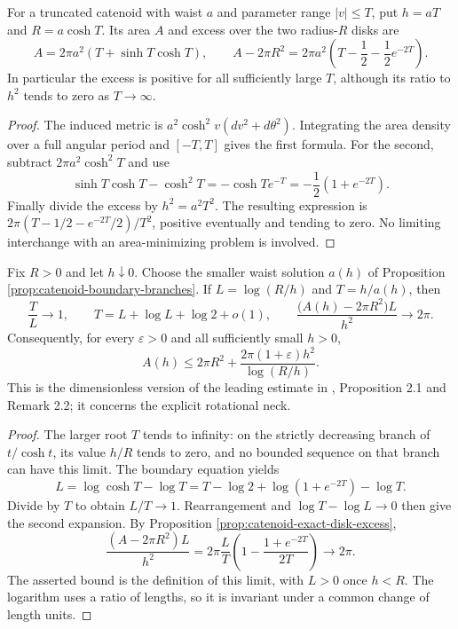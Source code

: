 \begin{proposition}\label{prop:catenoid-exact-disk-excess}
For a truncated catenoid with waist $a$ and parameter range $|v|\leq T$, put $h=aT$ and $R=a\cosh T$. Its area $A$ and excess over the two radius-$R$ disks are
\[
 A=2\pi a^2(T+\sinh T\cosh T),\qquad
 A-2\pi R^2=2\pi a^2\left(T-\frac12-\frac12e^{-2T}\right).
\]
In particular the excess is positive for all sufficiently large $T$, although its ratio to $h^2$ tends to zero as $T\to\infty$.
\end{proposition}
\begin{proof}
The induced metric is $a^2\cosh^2v(dv^2+d\theta^2)$. Integrating the area density over a full angular period and $[-T,T]$ gives the first formula. For the second, subtract $2\pi a^2\cosh^2T$ and use
\[
 \sinh T\cosh T-\cosh^2T=-\cosh T e^{-T}
 =-\frac12(1+e^{-2T}).
\]
Finally divide the excess by $h^2=a^2T^2$. The resulting expression is $2\pi(T-1/2-e^{-2T}/2)/T^2$, positive eventually and tending to zero. No limiting interchange with an area-minimizing problem is involved.
\end{proof}

\begin{theorem}\label{thm:catenoid-logarithmic-excess}
Fix $R>0$ and let $h\downarrow0$. Choose the smaller waist solution $a(h)$ of Proposition \ref{prop:catenoid-boundary-branches}. If $L=\log(R/h)$ and $T=h/a(h)$, then
\[
 \frac{T}{L}\longrightarrow1,\qquad
 T=L+\log L+\log2+o(1),\qquad
 \frac{\bigl(A(h)-2\pi R^2\bigr)L}{h^2}\longrightarrow2\pi.
\]
Consequently, for every $\varepsilon>0$ and all sufficiently small $h>0$,
\[
 A(h)\leq2\pi R^2+\frac{2\pi(1+\varepsilon)h^2}{\log(R/h)}.
\]
This is the dimensionless version of the leading estimate in \cite{KMN}, Proposition 2.1 and Remark 2.2; it concerns the explicit rotational neck.
\end{theorem}
\begin{proof}
The larger root $T$ tends to infinity: on the strictly decreasing branch of $t/\cosh t$, its value $h/R$ tends to zero, and no bounded sequence on that branch can have this limit. The boundary equation yields
\[
 L=\log\cosh T-\log T
 =T-\log2+\log(1+e^{-2T})-\log T.
\]
Divide by $T$ to obtain $L/T\to1$. Rearrangement and $\log T-\log L\to0$ then give the second expansion. By Proposition \ref{prop:catenoid-exact-disk-excess},
\[
 \frac{(A-2\pi R^2)L}{h^2}
 =2\pi\frac{L}{T}\left(1-\frac{1+e^{-2T}}{2T}\right)\longrightarrow2\pi.
\]
The asserted bound is the definition of this limit, with $L>0$ once $h<R$. The logarithm uses a ratio of lengths, so it is invariant under a common change of length units.
\end{proof}

